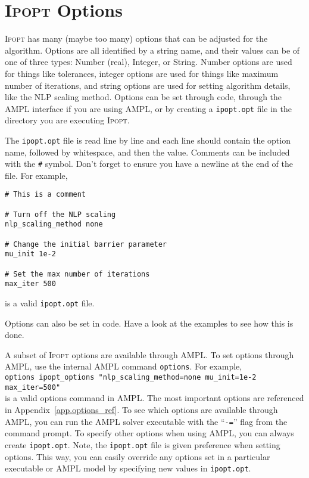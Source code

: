 \documentclass[10pt]{article}
\newcommand{\Ipopt}{\textsc{Ipopt}\xspace}
\begin{document}
\section{\Ipopt Options}\label{sec:options}
\Ipopt has many (maybe too many) options that can be adjusted for the
algorithm.  Options are all identified by a string name, and their
values can be of one of three types: Number (real), Integer, or
String. Number options are used for things like tolerances, integer
options are used for things like maximum number of iterations, and
string options are used for setting algorithm details, like the NLP
scaling method. Options can be set through code, through the AMPL
interface if you are using AMPL, or by creating a {\tt ipopt.opt}
file in the directory you are executing \Ipopt.

The {\tt ipopt.opt} file is read line by line and each line should
contain the option name, followed by whitespace, and then the
value. Comments can be included with the {\tt \#} symbol. Don't forget
to ensure you have a newline at the end of the file. For example,
\begin{verbatim}
# This is a comment

# Turn off the NLP scaling
nlp_scaling_method none

# Change the initial barrier parameter
mu_init 1e-2

# Set the max number of iterations
max_iter 500
\end{verbatim}
is a valid {\tt ipopt.opt} file.

Options can also be set in code. Have a look at the examples to see
how this is done. 

A subset of \Ipopt options are available through AMPL. To set options
through AMPL, use the internal AMPL command {\tt options}.  For
example, \\
{\tt options ipopt\_options "nlp\_scaling\_method=none mu\_init=1e-2
  max\_iter=500"} \\
is a valid options command in AMPL. The most important options are
referenced in Appendix~\ref{app.options_ref}. To see which options are
available through AMPL, you can run the AMPL solver executable with
the ``{\tt -=}'' flag from the command prompt.  To specify other
options when using AMPL, you can always create {\tt ipopt.opt}.  Note,
the {\tt ipopt.opt} file is given preference when setting options.
This way, you can easily override any options set in a particular
executable or AMPL model by specifying new values in {\tt ipopt.opt}.
\end{document}
